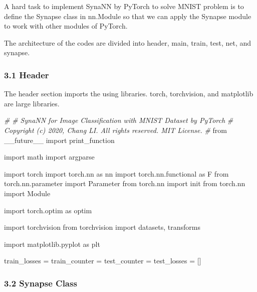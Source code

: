 \documentclass[
]{article}
\newenvironment{Shaded}{}{}
\newcommand{\CommentTok}[1]{\textcolor[rgb]{0.38,0.63,0.69}{\textit{#1}}}
\newcommand{\ImportTok}[1]{#1}
\newcommand{\NormalTok}[1]{#1}
\newcommand{\OperatorTok}[1]{\textcolor[rgb]{0.40,0.40,0.40}{#1}}
\begin{document}
A hard task to implement SynaNN by PyTorch to solve MNIST problem is to
define the Synapse class in nn.Module so that we can apply the Synapse
module to work with other modules of PyTorch.

The architecture of the codes are divided into header, main, train,
test, net, and synapse.

\hypertarget{header-n46}{%
\subsubsection{3.1 Header}\label{header-n46}}

The header section imports the using libraries. torch, torchvision, and
matplotlib are large libraries.

\begin{Shaded}
\begin{Highlighting}[]
\CommentTok{\#}
\CommentTok{\# SynaNN for Image Classification with MNIST Dataset by PyTorch}
\CommentTok{\# Copyright (c) 2020, Chang LI. All rights reserved. MIT License.}
\CommentTok{\#}
\ImportTok{from}\NormalTok{ \_\_future\_\_ }\ImportTok{import}\NormalTok{ print\_function}

\ImportTok{import}\NormalTok{ math}
\ImportTok{import}\NormalTok{ argparse}

\ImportTok{import}\NormalTok{ torch}
\ImportTok{import}\NormalTok{ torch.nn }\ImportTok{as}\NormalTok{ nn}
\ImportTok{import}\NormalTok{ torch.nn.functional }\ImportTok{as}\NormalTok{ F}
\ImportTok{from}\NormalTok{ torch.nn.parameter }\ImportTok{import}\NormalTok{ Parameter}
\ImportTok{from}\NormalTok{ torch.nn }\ImportTok{import}\NormalTok{ init}
\ImportTok{from}\NormalTok{ torch.nn }\ImportTok{import}\NormalTok{ Module}

\ImportTok{import}\NormalTok{ torch.optim }\ImportTok{as}\NormalTok{ optim}

\ImportTok{import}\NormalTok{ torchvision}
\ImportTok{from}\NormalTok{ torchvision }\ImportTok{import}\NormalTok{ datasets, transforms}

\ImportTok{import}\NormalTok{ matplotlib.pyplot }\ImportTok{as}\NormalTok{ plt}

\NormalTok{train\_losses }\OperatorTok{=}\NormalTok{ train\_counter }\OperatorTok{=}\NormalTok{ test\_counter }\OperatorTok{=}\NormalTok{ test\_losses }\OperatorTok{=}\NormalTok{ []}
\end{Highlighting}
\end{Shaded}

\hypertarget{header-n49}{%
\subsubsection{3.2 Synapse Class}\label{header-n49}}
\end{document}
